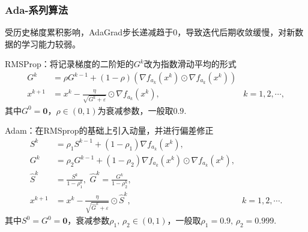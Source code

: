 \documentclass[9pt,aspectratio=169]{beamer}
\begin{document}
\begin{frame}
	\frametitle{Ada-系列算法}
受历史梯度累积影响，AdaGrad步长递减趋于0，导致迭代后期收敛缓慢，对新数据的学习能力较弱。
\begin{block}{RMSProp：将记录梯度的二阶矩的$G^k$改为指数滑动平均的形式}
	\begin{equation}\label{RMSPropdiedaigeshi}
        \begin{aligned}
            G ^k&=\rho G^{k-1}+(1-\rho)(\nabla f_{a_k}(x^k)\odot \nabla f_{a_k}(x^k)) &\\ 
          x^{k+1}&=x^k- \frac{\eta }{\sqrt{G^k+\varepsilon}} \odot \nabla f_{a_k}(x^k), & k=1,2,\cdots,
		\end{aligned}
      \end{equation}
      其中$G^0=\mathbf{0}$，$\rho\in(0,1)$为衰减参数，一般取$0.9$.\ 
\end{block}
\begin{block}{Adam：在RMSprop的基础上引入动量，并进行偏差修正}
	\begin{equation}
		\begin{aligned}
			S^{k}&=\rho_1 S^{k-1}+(1-\rho_1) \nabla f_{a_k}(x^k),  \\
			G^k&=\rho_2 G^{k-1}+(1-\rho_2)\nabla f_{a_k}(x^k)\odot \nabla f_{a_k}(x^k), \\ 
			\hat{S}^k&=\frac{S^k }{1-\rho_1^k},\,\,\hat{G}^k=\frac{G^k }{1-\rho_2^k}, \\ 
			x^{k+1}&=x^k- \frac{\eta }{\sqrt{\hat{G}^k+\varepsilon}} \odot \hat{S}^k, & k=1,2,\cdots.
		\end{aligned}
	\end{equation}	
其中$S^0=G^0=\mathbf{0}$，衰减参数$\rho_1,\,\rho_2\in(0,1)$，一般取$\rho_1=0.9,\,\rho_2=0.999$.
\end{block}
\end{frame}
\end{document}
